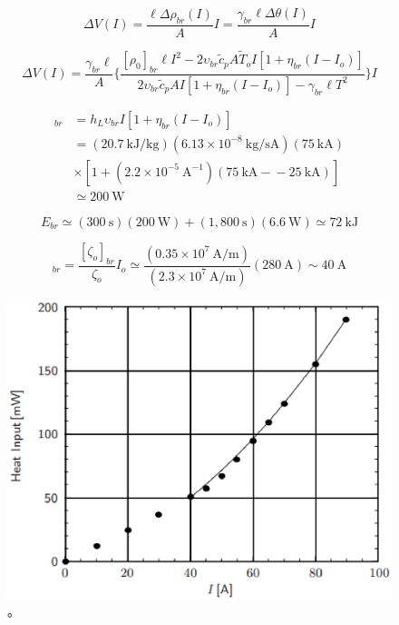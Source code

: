 \begin{equation}
\Delta V(I)=\frac{\ell\Delta\rho_{br}(I)}{A}I=\frac{\gamma_{br}\ell\Delta\theta(I)}{A}I
\end{equation}

\begin{equation}%
\Delta V(I)=\frac{\gamma_{br}\ell}{A}\{\frac{[\rho_0]_{br}\ell I^2-2\upsilon_{br}\tilde{c}_pA\tilde{T}_oI[1+\eta_{br}(I-I_o)]}{2\upsilon_{br}\tilde{c}_pAI[1+\eta_{br}(I-I_o)]-\gamma_{br}\ell T^2}\}I
\end{equation}

\begin{align*}%
[Q_{I_o}]_{br}&=h_L\upsilon_{br}I[1+\eta_{br}(I-I_o)] \\
&=(20.7\ \mathrm{kJ/kg})(6.13\times 10^{-8}\ \mathrm{kg/sA})(75\ \mathrm{kA}) \\
&\times[1+(2.2\times 10^{-5}\ \mathrm{A^{-1}})(75\ \mathrm{kA-}-25\ \mathrm{kA})]\\
&\simeq 200\ \mathrm{W}
\end{align*}

\begin{equation}
E_{br}\simeq(300\ \mathrm{s})(200\ \mathrm{W})+(1,800\ \mathrm{s})(6.6\ \mathrm{W}) 
\simeq 72\ \mathrm{kJ}
\end{equation}

\begin{equation}
[I_o]_{br}=\frac{[\zeta_o]_{br}}{\zeta_o}I_o 
\simeq\frac{(0.35\times 10^7\ \mathrm{A/m})}{(2.3\times 10^7\ \mathrm{A/m})}(280\ \mathrm{A})\sim 40\ \mathrm{A}
\end{equation}


\begin{figure}[htbp]
	\centering
	\includegraphics[scale=0.7]{chpt4/figs/fig4.25.eps}
	\caption{。}
\end{figure}

